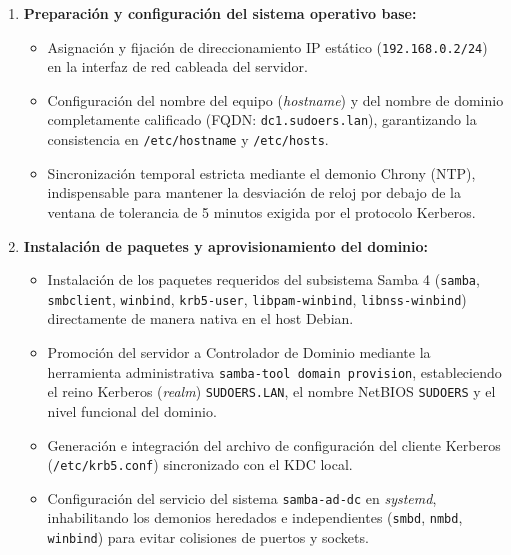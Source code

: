 \begin{enumerate}[label=\textbf{\arabic*.}]
    \item \textbf{Preparación y configuración del sistema operativo base:}
    \begin{itemize}
        \item Asignación y fijación de direccionamiento IP estático (\texttt{192.168.0.2/24}) en la interfaz de red cableada del servidor.
        \item Configuración del nombre del equipo (\textit{hostname}) y del nombre de dominio completamente calificado (FQDN: \texttt{dc1.sudoers.lan}), garantizando la consistencia en \texttt{/etc/hostname} y \texttt{/etc/hosts}.
        \item Sincronización temporal estricta mediante el demonio Chrony (NTP), indispensable para mantener la desviación de reloj por debajo de la ventana de tolerancia de 5 minutos exigida por el protocolo Kerberos.
    \end{itemize}

    \item \textbf{Instalación de paquetes y aprovisionamiento del dominio:}
    \begin{itemize}
        \item Instalación de los paquetes requeridos del subsistema Samba 4 (\texttt{samba}, \texttt{smbclient}, \texttt{winbind}, \texttt{krb5-user}, \texttt{libpam-winbind}, \texttt{libnss-winbind}) directamente de manera nativa en el host Debian.
        \item Promoción del servidor a Controlador de Dominio mediante la herramienta administrativa \texttt{samba-tool domain provision}, estableciendo el reino Kerberos (\textit{realm}) \texttt{SUDOERS.LAN}, el nombre NetBIOS \texttt{SUDOERS} y el nivel funcional del dominio.
        \item Generación e integración del archivo de configuración del cliente Kerberos (\texttt{/etc/krb5.conf}) sincronizado con el KDC local.
        \item Configuración del servicio del sistema \texttt{samba-ad-dc} en \textit{systemd}, inhabilitando los demonios heredados e independientes (\texttt{smbd}, \texttt{nmbd}, \texttt{winbind}) para evitar colisiones de puertos y sockets.
    \end{itemize}


\end{enumerate}
